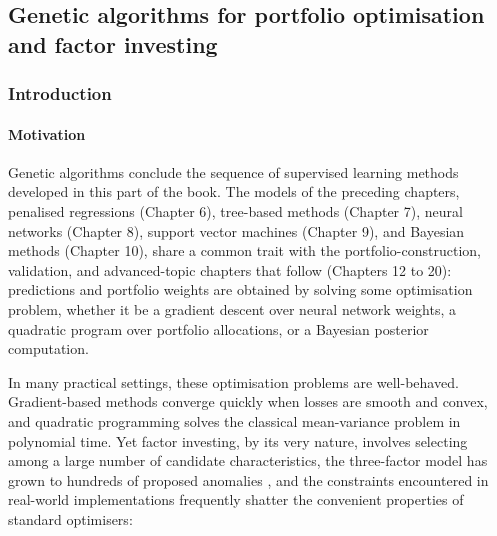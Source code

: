 \subsection{Genetic algorithms for portfolio optimisation and factor investing}

% 
%

\subsubsection{Introduction}

\paragraph{Motivation}

Genetic algorithms conclude the sequence of supervised learning methods developed in this part of the book. The models of the preceding chapters, penalised regressions (Chapter 6), tree-based methods (Chapter 7), neural networks (Chapter 8), support vector machines (Chapter 9), and Bayesian methods (Chapter 10), share a common trait with the portfolio-construction, validation, and advanced-topic chapters that follow (Chapters 12 to 20): predictions and portfolio weights are obtained by solving some optimisation problem, whether it be a gradient descent over neural network weights, a quadratic program over portfolio allocations, or a Bayesian posterior computation.

In many practical settings, these optimisation problems are well-behaved. Gradient-based methods converge quickly when losses are smooth and convex, and quadratic programming solves the classical \cite{markowitz1952portfolio} mean-variance problem in polynomial time. Yet factor investing, by its very nature, involves selecting among a large number of candidate characteristics, the \cite{fama1993common} three-factor model has grown to hundreds of proposed anomalies \citep{harvey2016and}, and the constraints encountered in real-world implementations frequently shatter the convenient properties of standard optimisers:

